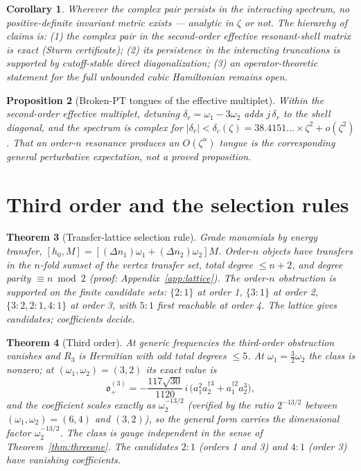 \documentclass[11pt]{article}
\newtheorem{theorem}{Theorem}[section]
\newtheorem{proposition}[theorem]{Proposition}
\newtheorem{corollary}[theorem]{Corollary}
\theoremstyle{definition}
\theoremstyle{remark}
\newcommand{\w}{\omega}
\newcommand{\dg}{\dagger}
\newcommand{\ob}{\mathfrak o}
\begin{document}
\begin{corollary}
Wherever the complex pair persists in the interacting spectrum, no
positive-definite invariant metric exists --- analytic in $\zeta$ or
not.  The hierarchy of claims is: (1) the complex pair in the
second-order effective resonant-shell matrix is \emph{exact} (Sturm
certificate); (2) its persistence in the interacting truncations is
supported by cutoff-stable direct diagonalization; (3) an
operator-theoretic statement for the full unbounded cubic Hamiltonian
remains open.
\end{corollary}

\begin{proposition}[Broken-PT tongues of the effective multiplet]
Within the second-order effective multiplet, detuning
$\delta_r=\w_1-3\w_2$ adds $j\,\delta_r$ to the shell diagonal, and the
spectrum is complex for
$|\delta_r|<\delta_c(\zeta)=38.4151\ldots\times\zeta^2+o(\zeta^2)$.
That an order-$n$ resonance produces an $O(\zeta^n)$ tongue is the
corresponding general perturbative expectation, not a proved
proposition.
\end{proposition}

\section{Third order and the selection rules}\label{sec:selection}

\begin{theorem}[Transfer-lattice selection rule]\label{thm:selection}
Grade monomials by energy transfer, $[h_0,M]=[(\Delta n_1)\w_1
+(\Delta n_2)\w_2]M$.  Order-$n$ objects have transfers in the $n$-fold
sumset of the vertex transfer set, total degree $\le n+2$, and degree
parity $\equiv n\bmod2$ (proof: Appendix~\ref{app:lattice}).  The
order-$n$ obstruction is supported on the finite candidate sets:
$\{2{:}1\}$ at order 1, $\{3{:}1\}$ at order 2,
$\{3{:}2,2{:}1,4{:}1\}$ at order 3, with $5{:}1$ first reachable at
order 4.  The lattice gives candidates; coefficients decide.
\end{theorem}

\begin{theorem}[Third order]\label{thm:third}
At generic frequencies the third-order obstruction vanishes and $R_3$
is Hermitian with odd total degrees $\le5$.  At $\w_1=\tfrac32\w_2$ the
class is nonzero; at $(\w_1,\w_2)=(3,2)$ its exact value is
\begin{equation}
\ob_+^{(3)}
=-\frac{117\sqrt{30}}{1120}\,i\,
\big(a_1^2a_2^{\dg3}+a_1^{\dg2}a_2^3\big),
\end{equation}
and the coefficient scales exactly as $\w_2^{-13/2}$ (verified by the
ratio $2^{-13/2}$ between $(\w_1,\w_2)=(6,4)$ and $(3,2)$), so the
general form carries the dimensional factor $\w_2^{-13/2}$.  The class
is gauge independent in the sense of Theorem~\ref{thm:threeone}.  The
candidates $2{:}1$ (orders 1 and 3) and $4{:}1$ (order 3) have
vanishing coefficients.
\end{theorem}
\end{document}
